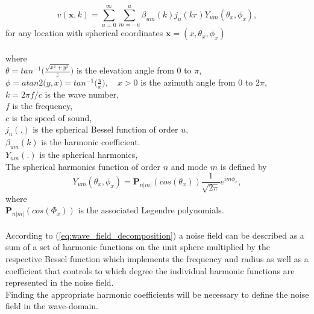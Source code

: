 \begin{equation}
    v(\mathbf{x},k)=\sum_{u=0}^\infty \sum_{m=-u}^u\beta_{um}(k)j_u(kr)Y_{um}(\theta_x,\phi_x),
    \label{eq:wave_field_decomposition}
\end{equation}
for any location with spherical coordinates $\mathbf{x}=(x,\theta_x,\phi_x)$\\\\
where\\
$\theta = tan^{-1}\bigg(\frac{\sqrt{x^2+y^2}}{z}\bigg)$ is the elevation angle from $0$ to $\pi$,\\
$\phi = atan2\bigg(y,x\bigg) = tan^{-1}\bigg(\frac{y}{x}\bigg),\quad  x >0$ is the azimuth angle from $0$ to $2\pi$,\\
$k=2\pi f/c$ is the wave number,\\
$f$ is the frequency,\\
$c$ is the speed of sound,\\
$j_u(.)$ is the spherical Bessel function of order $u$,\\
$\beta_{um}(k)$ is the harmonic coefficient.\\ 
$Y_{um}(.)$ is the spherical harmonics,\\
The spherical harmonics function of order $n$ and mode $m$ is defined by\cite{Samarasinghe2018}
\begin{equation}
    Y_{um}(\theta_x,\phi_x) = \mathbf{P}_{n|m|}(cos(\theta_x))\frac{1}{\sqrt{2\pi}}e^{im\phi_x},
\end{equation}
where\\
$\mathbf{P}_{n|m|}(cos(\Phi_x))$ is the associated Legendre polynomials.\\\\

According to (\ref{eq:wave_field_decomposition}) a noise field can be described as a sum of a set of harmonic functions on the unit sphere multiplied by the respective Bessel function which implements the frequency and radius as well as a coefficient that controls to which degree the individual harmonic functions are represented in the noise field.\\
Finding the appropriate harmonic coefficients will be necessary to define the noise field in the wave-domain.
